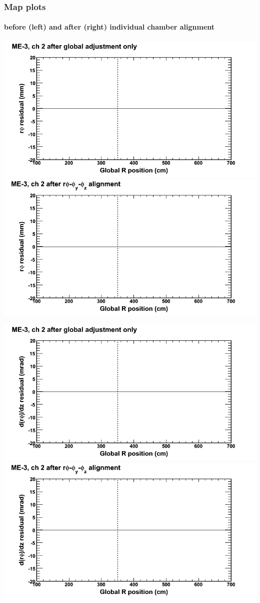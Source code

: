 \documentclass[compress]{beamer}
\begin{document}
\begin{frame}
\frametitle{Map plots}
\framesubtitle{before (left) and after (right) individual chamber alignment}
\includegraphics[width=0.5\linewidth]{ringmapplots_3dof/before_CSCvsr_mem3ch02_x.png} \includegraphics[width=0.5\linewidth]{ringmapplots_3dof/after_CSCvsr_mem3ch02_x.png}

\includegraphics[width=0.5\linewidth]{ringmapplots_3dof/before_CSCvsr_mem3ch02_dxdz.png} \includegraphics[width=0.5\linewidth]{ringmapplots_3dof/after_CSCvsr_mem3ch02_dxdz.png}
\end{frame}
\end{document}
